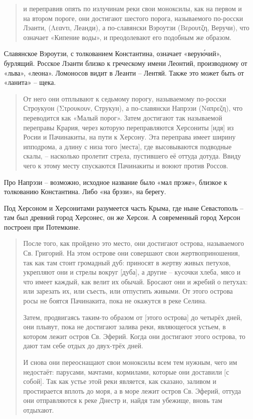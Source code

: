 \begin{quotation}
и переправив опять по излучинам реки свои моноксилы, как на первом и на втором пороге, они достигают шестого порога, называемого по-росски Лэанти, (Λεαντι, Леанди), а по-славянски Вэроутзи  (Βερουτζη, Веручи), что означает «Кипение воды», и преодолевают его подобным же образом. 
\end{quotation}

Славянское Вэроутзи, с толкованием Константина, означает «веру\'ючий», бурлящий. Росское Лэанти близко к греческому имени Леонтий, производному от «льва», «леона». Ломоносов видит в Леанти – Лентяй. Также это может быть от «ланита» – щека.

\begin{quotation}
От него они отплывают к седьмому порогу, называемому по-росски Строукуон (Στρουκουν, Струкун), а по-славянски Напрэзи (Ναπρεζη), что переводится как «Малый порог». Затем достигают так называемой переправы Крария, через которую переправляются Херсониты [идя] из Росии и Пачинакиты, на пути к Херсону. Эта переправа имеет ширину ипподрома, а длину с низа того [места], где высовываются подводные скалы, – насколько пролетит стрела, пустившего её оттуда дотуда. Ввиду чего к этому месту спускаются Пачинакиты и воюют против Россов. 
\end{quotation}

Про Напрэзи – возможно, исходное название было «мал прэже», близкое к толкованию Константина. Либо «на брэзи», на берегу.

Под Херсоном и Херсонитами разумеется часть Крыма, где ныне Севастополь – там был древний город Херсонес, он же Херсон. А современный город Херсон построен при Потемкине.

\begin{quotation}
После того, как пройдено это место, они достигают острова, называемого Св. Григорий. На этом острове они совершают свои жертвоприношения, так как там стоит громадный дуб: приносят в жертву живых петухов, укрепляют они и стрелы вокруг [дуба], а другие – кусочки хлеба, мясо и что имеет каждый, как велит их обычай. Бросают они и жребий о петухах: или зарезать их, или съесть, или отпустить живыми. От этого острова росы не боятся Пачинакита, пока не окажутся в реке Селина. 

Затем, продвигаясь таким-то образом от [этого острова] до четырёх дней, они плывут, пока не достигают залива реки, являющегося устьем, в котором лежит остров Св. Эферий. Когда они достигают этого острова, то дают там себе отдых до двух-трёх дней. 

И снова они переоснащают свои моноксилы всем тем нужным, чего им недостаёт: парусами, мачтами, кормилами, которые они доставили [с собой]. Так как устье этой реки является, как сказано, заливом и простирается вплоть до моря, а в море лежит остров Св. Эферий, оттуда они отправляются к реке Днестр и, найдя там убежище, вновь там отдыхают. 
\end{quotation}

